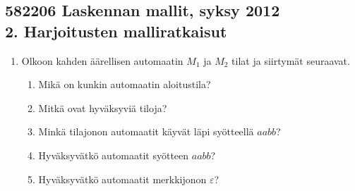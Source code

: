 \documentclass[a4paper,11pt,draft]{article}
\begin{document}
\subsection*{582206 Laskennan mallit, syksy 2012\\
2. Harjoitusten malliratkaisut}

\begin{enumerate}
\item
  Olkoon kahden äärellisen automaatin $M_1$ ja $M_2$ tilat ja
  siirtymät seuraavat.
  

  \begin{enumerate}
  \item
    Mikä on kunkin automaatin aloitustila?
  \item
    Mitkä ovat hyväksyviä tiloja?
  \item
    Minkä tilajonon automaatit käyvät läpi syötteellä $aabb$?
  \item
    Hyväksyvätkö automaatit syötteen $aabb$?
  \item
    Hyväksyvätkö automaatit merkkijonon $\varepsilon$?
  \end{enumerate}
\end{enumerate}
\end{document}
